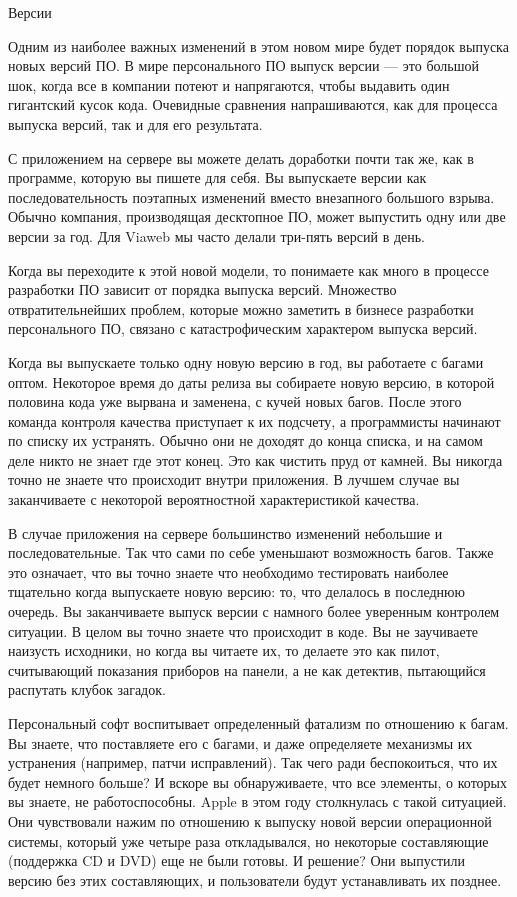\documentclass[ebook,12pt,oneside,openany]{memoir}
\begin{document}
Версии

Одним из наиболее важных изменений в этом новом мире будет порядок
выпуска новых версий ПО. В мире персонального ПО выпуск версии — это
большой шок, когда все в компании потеют и напрягаются, чтобы выдавить
один гигантский кусок кода. Очевидные сравнения напрашиваются, как для
процесса выпуска версий, так и для его результата.

С приложением на сервере вы можете делать доработки почти так же, как
в программе, которую вы пишете для себя. Вы выпускаете версии как
последовательность поэтапных изменений вместо внезапного большого
взрыва. Обычно компания, производящая десктопное ПО, может выпустить
одну или две версии за год. Для Viaweb мы часто делали три-пять версий
в день.

Когда вы переходите к этой новой модели, то понимаете как много в
процессе разработки ПО зависит от порядка выпуска версий. Множество
отвратительнейших проблем, которые можно заметить в бизнесе разработки
персонального ПО, связано с катастрофическим характером выпуска
версий.

Когда вы выпускаете только одну новую версию в год, вы работаете с
багами оптом. Некоторое время до даты релиза вы собираете новую
версию, в которой половина кода уже вырвана и заменена, с кучей новых
багов. После этого команда контроля качества приступает к их подсчету,
а программисты начинают по списку их устранять. Обычно они не доходят
до конца списка, и на самом деле никто не знает где этот конец. Это
как чистить пруд от камней. Вы никогда точно не знаете что происходит
внутри приложения. В лучшем случае вы заканчиваете с некоторой
вероятностной характеристикой качества.

В случае приложения на сервере большинство изменений небольшие и
последовательные. Так что сами по себе уменьшают возможность багов.
Также это означает, что вы точно знаете что необходимо тестировать
наиболее тщательно когда выпускаете новую версию: то, что делалось в
последнюю очередь. Вы заканчиваете выпуск версии с намного более
уверенным контролем ситуации. В целом вы точно знаете что происходит в
коде. Вы не заучиваете наизусть исходники, но когда вы читаете их, то
делаете это как пилот, считывающий показания приборов на панели, а не
как детектив, пытающийся распутать клубок загадок.

Персональный софт воспитывает определенный фатализм по отношению к
багам. Вы знаете, что поставляете его с багами, и даже определяете
механизмы их устранения (например, патчи исправлений). Так чего ради
беспокоиться, что их будет немного больше? И вскоре вы обнаруживаете,
что все элементы, о которых вы знаете, не работоспособны. Apple в этом
году столкнулась с такой ситуацией. Они чувствовали нажим по отношению
к выпуску новой версии операционной системы, который уже четыре раза
откладывался, но некоторые составляющие (поддержка CD и DVD) еще не
были готовы. И решение? Они выпустили версию без этих составляющих, и
пользователи будут устанавливать их позднее.
\end{document}
